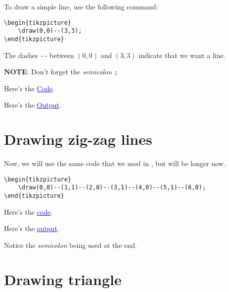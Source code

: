 \documentclass{book}
\newcommand{\bold}[1]{\textbf{#1}}
\newcommand{\italic}[1]{\textit{#1}}
\begin{document}
To draw a simple line, use the following command:

\begin{lstlisting}[frame=tlBR, breaklines=true, caption=Draw a simple line, label=lst:lst2]
\begin{tikzpicture}
	\draw(0,0)--(3,3);
\end{tikzpicture}
\end{lstlisting}

The dashes \lstinline|--| between $(0,0)$ and $(3,3)$ indicate that we want a line.

\bold{NOTE}: Don't forget the \italic{semicolon} \lstinline|;|

Here's the \href{https://github.com/0x50-0x42/latex/blob/LaTeX/Tikz/codes/simpleLine.tex}{\textcolor{blue}{Code}}.

Here's the \href{https://github.com/0x50-0x42/latex/blob/LaTeX/Tikz/codes/simpleLine.pdf}{\textcolor{blue}{Output}}.

\section{Drawing zig-zag lines}
\paragraph{}

Now, we will use the same code that we used in \bold{}, but will be longer now.

\begin{lstlisting}[frame=tlBR, breaklines=true, caption=Draw a zig-zag line, label=lst:lst3]
\begin{tikzpicture}
	\draw(0,0)--(1,1)--(2,0)--(3,1)--(4,0)--(5,1)--(6,0);
\end{tikzpicture}
\end{lstlisting}

Here's the \href{https://github.com/0x50-0x42/latex/blob/LaTeX/Tikz/codes/zig_zag.tex}{\textcolor{blue}{code}}.

Here's the \href{https://github.com/0x50-0x42/latex/blob/LaTeX/Tikz/codes/zig_zag.pdf}{\textcolor{blue}{output}}.

Notice the \emph{semicolon} being used at the end.

\section{Drawing triangle}
\paragraph{}
\end{document}
